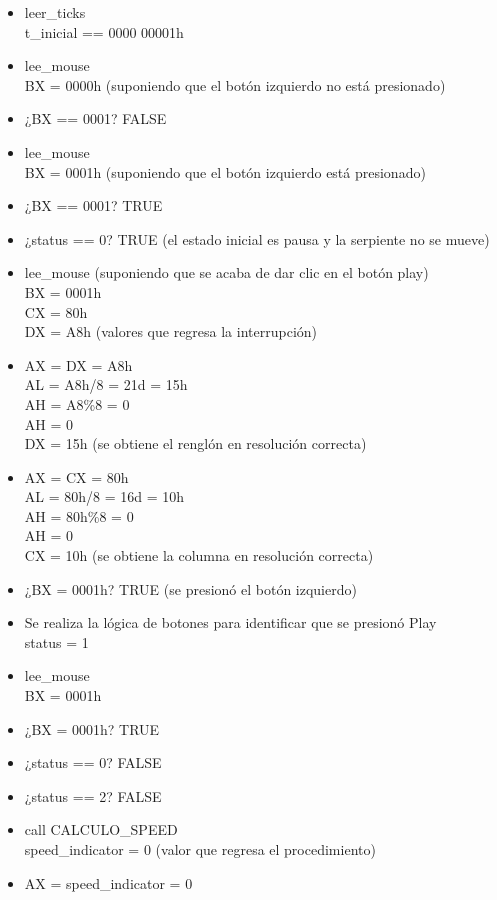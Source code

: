 \documentclass[12pt]{article}
\begin{document}
\begin{enumerate}
\begin{itemize}
        \item leer\_ticks \\ t\_inicial == 0000 00001h 
        \item lee\_mouse \\ BX = 0000h (suponiendo que el botón izquierdo no está presionado)
        \item ¿BX == 0001? FALSE 
        \item lee\_mouse \\ BX = 0001h (suponiendo que el botón izquierdo está presionado)
        \item ¿BX == 0001? TRUE
        \item ¿status == 0? TRUE (el estado inicial es pausa y la serpiente no se mueve)
        \item lee\_mouse (suponiendo que se acaba de dar clic en el botón play) \\ BX = 0001h\\ CX = 80h \\ DX = A8h (valores que regresa la interrupción)
        \item AX = DX = A8h \\ AL = A8h/8 = 21d = 15h \\ AH = A8\%8 = 0 \\ AH = 0 \\DX = 15h (se obtiene el renglón en resolución correcta)
        \item AX = CX = 80h \\ AL = 80h/8 = 16d = 10h \\ AH = 80h\%8 = 0 \\ AH = 0 \\CX = 10h (se obtiene la columna en resolución correcta)
        \item ¿BX = 0001h? TRUE (se presionó el botón izquierdo)
        \item Se realiza la lógica de botones para identificar que se presionó Play \\ status = 1
        \item lee\_mouse \\ BX = 0001h
        \item ¿BX = 0001h? TRUE
        \item ¿status == 0? FALSE
        \item ¿status == 2? FALSE
        \item call CALCULO\_SPEED \\ speed\_indicator = 0 (valor que regresa el procedimiento)
        \item AX = speed\_indicator = 0

\end{itemize}
\end{enumerate}
\end{document}
